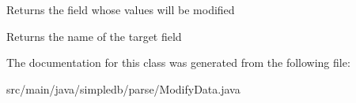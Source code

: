 Returns the field whose values will be modified \begin{DoxyReturn}{Returns}
the name of the target field 
\end{DoxyReturn}


The documentation for this class was generated from the following file\+:\begin{DoxyCompactItemize}
\item 
src/main/java/simpledb/parse/Modify\+Data.\+java\end{DoxyCompactItemize}
